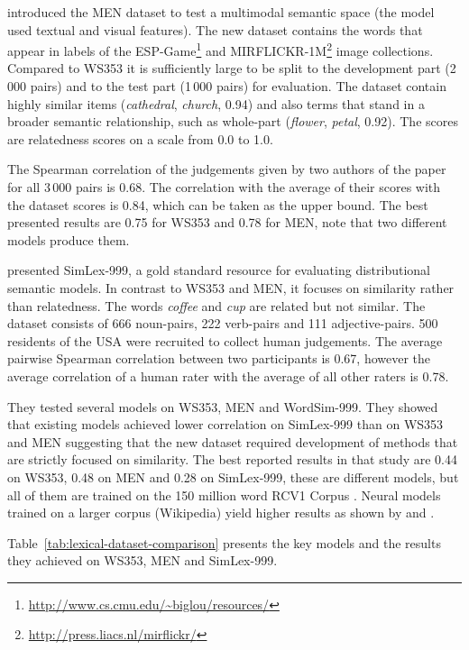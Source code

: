  introduced the MEN dataset to test a multimodal semantic space (the model used textual and visual features). The new dataset contains the words that appear in labels of the ESP-Game\footnote{\url{http://www.cs.cmu.edu/~biglou/resources/}} and MIRFLICKR-1M\footnote{\url{http://press.liacs.nl/mirflickr/}} image collections. Compared to WS353 it is sufficiently large to be split to the development part (2\,000 pairs) and to the test part (1\,000 pairs) for evaluation. The dataset contain highly similar items (\textit{cathedral}, \textit{church}, 0.94) and also terms that stand in a broader semantic relationship, such as whole-part (\textit{flower}, \textit{petal}, 0.92). The scores are relatedness scores on a scale from 0.0 to 1.0.

The Spearman correlation of the judgements given by two authors of the paper for all 3\,000 pairs is 0.68. The correlation with the average of their scores with the dataset scores is 0.84, which can be taken as the upper bound. The best presented results are 0.75 for WS353 and 0.78 for MEN, note that two different models produce them.

 presented SimLex-999, a gold standard resource for evaluating distributional semantic models. In contrast to WS353 and MEN, it focuses on similarity rather than relatedness. The words \textit{coffee} and \textit{cup} are related but not similar. The dataset consists of 666 noun-pairs, 222 verb-pairs and 111 adjective-pairs. 500 residents of the USA were recruited to collect human judgements. The average pairwise Spearman correlation between two participants is 0.67, however the average correlation of a human rater with the average of all other raters is 0.78.

They tested several models on WS353, MEN and WordSim-999. They showed that existing models achieved lower correlation on SimLex-999 than on WS353 and MEN suggesting that the new dataset required development of methods that are strictly focused on similarity. The best reported results in that study are 0.44 on WS353, 0.48 on MEN and 0.28 on SimLex-999, these are different models, but all of them are trained on the 150 million word RCV1 Corpus \cite{lewis2004rcv1}. Neural models trained on a larger corpus (Wikipedia) yield higher results as shown by  and .

Table~\ref{tab:lexical-dataset-comparison} presents the key models and the results they achieved on WS353, MEN and SimLex-999.

